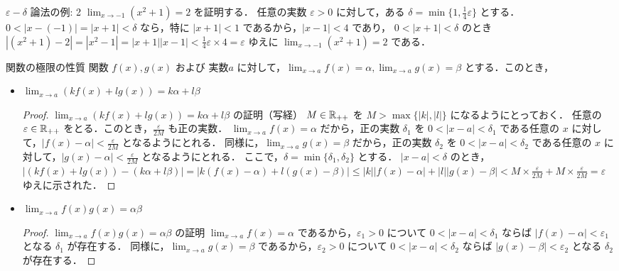 \documentclass[a4paper]{ltjsarticle}
\begin{document}
  \begin{tcb}{$\varepsilon - \delta$ 論法の例: 2}{}
    $\displaystyle \lim_{x \to -1} (x^2 + 1) = 2$ を証明する．
    任意の実数 $\varepsilon >0 $ に対して，ある $\delta = \min\{1, \frac{1}{4}\varepsilon\}$ とする．
    $0 < |x - (-1)| = |x + 1| < \delta$ なら，特に $|x + 1| < 1$ であるから，$|x - 1| < 4$ であり，
    $0 < |x + 1| < \delta$ のとき $|(x^2 + 1) - 2| = |x^2 - 1| = |x + 1| |x - 1| < \frac{1}{4}\varepsilon \times 4 = \varepsilon$
    ゆえに $\displaystyle \lim_{x \to -1} (x^2 + 1) = 2$ である．
  \end{tcb}

  \begin{theorem}{関数の極限の性質}{}
    関数 $f(x), g(x)$ および 実数$a$ に対して，$\displaystyle \lim_{x \to a} f(x) = \alpha, \lim_{x \to a} g(x) = \beta$ とする．このとき，
    \begin{itemize}
      \item $\displaystyle \lim_{x \to a} (k f(x) + l g(x)) = k\alpha + l\beta$
      \begin{proof}{$\displaystyle \lim_{x \to a} (k f(x) + l g(x)) = k\alpha + l\beta$ の証明（写経）}{}
        $M \in \mathbb{R}_{++}$ を $M > \max\{|k|, |l|\}$ になるようにとっておく．
        任意の $\varepsilon \in \mathbb{R}_{++}$ をとる．このとき，$\frac{\varepsilon}{2M}$ も正の実数．
        $\lim_{x \to a} f(x) = \alpha$ だから，正の実数 $\delta_1$ を $0 < |x - a| < \delta_1$ である任意の $x$ に対して，$|f(x) - \alpha| < \frac{\varepsilon}{2M}$ となるようにとれる．
        同様に，$\lim_{x \to a} g(x) = \beta$ だから，正の実数 $\delta_2$ を $0 < |x - a| < \delta_2$ である任意の $x$ に対して，$|g(x) - \alpha| < \frac{\varepsilon}{2M}$ となるようにとれる．
        ここで，$\delta= \min\{\delta_1, \delta_2\}$ とする． $|x - a| < \delta$ のとき，$|(kf(x) + lg(x)) - (k\alpha + l \beta)| 
        = |k(f(x) - \alpha) + l(g(x) - \beta)| \leq |k||f(x) - \alpha| + |l| |g(x) - \beta| < M \times \frac{\varepsilon}{2M} + M \times \frac{\varepsilon}{2M} = \varepsilon$
        ゆえに示された．
      \end{proof}
      \item $\displaystyle \lim_{x \to a} f(x)g(x) = \alpha\beta$ 
      \begin{proof}{$\displaystyle \lim_{x \to a} f(x)g(x) = \alpha\beta$ の証明}{}
        $\lim_{x \to a} f(x) = \alpha$ であるから，$\varepsilon_1 > 0$ について $0 < |x - a| < \delta_1$ ならば $|f(x) - \alpha| < \varepsilon_1$ となる $\delta_1$ が存在する．
        同様に，$\lim_{x \to a} g(x) = \beta$ であるから，$\varepsilon_2 > 0$ について $0 < |x - a| < \delta_2$ ならば $|g(x) - \beta| < \varepsilon_2$ となる $\delta_2$ が存在する．

\end{proof}
\end{itemize}
\end{theorem}
\end{document}
